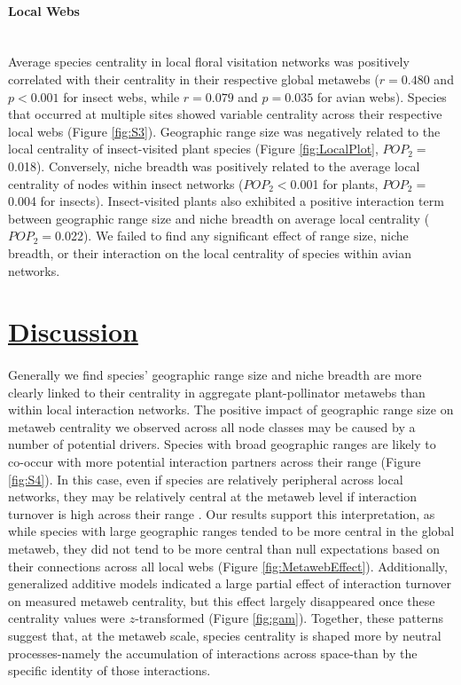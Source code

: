 \paragraph*{Local Webs}\mbox{}\\ 
Average species centrality in local floral visitation networks was positively correlated with their centrality in their respective global metawebs ($r=0.480$ and $p<0.001$ for insect webs, while $r=0.079$ and $p=0.035$ for avian webs). Species that occurred at multiple sites showed variable centrality across their respective local webs (Figure \ref{fig:S3}). Geographic range size was negatively related to the local centrality of insect-visited plant species (Figure \ref{fig:LocalPlot}, $POP_2=$0.018). Conversely, niche breadth was positively related to the average local centrality of nodes within insect networks ($POP_2<$0.001 for plants, $POP_2=$0.004 for insects). Insect-visited plants also exhibited a positive interaction term between geographic range size and niche breadth on average local centrality ($POP_2=$0.022). We failed to find any significant effect of range size, niche breadth, or their interaction on the local centrality of species within avian networks.






\section*{\textbf{\underline{Discussion}}}
\paragraph*{} Generally we find species' geographic range size and niche breadth are more clearly linked to their centrality in aggregate plant-pollinator metawebs than within local interaction networks. The positive impact of geographic range size on metaweb centrality we observed across all node classes may be caused by a number of potential drivers. Species with broad geographic ranges are likely to co-occur with more potential interaction partners across their range (Figure \ref{fig:S4}). In this case, even if species are relatively peripheral across local networks, they may be relatively central at the metaweb level if interaction turnover is high across their range \parencite{martins2025determinants}. Our results support this interpretation, as while species with large geographic ranges tended to be more central in the global metaweb, they did not tend to be more central than null expectations based on their connections across all local webs (Figure \ref{fig:MetawebEffect}). Additionally, generalized additive models indicated a large partial effect of interaction turnover on measured metaweb centrality, but this effect largely disappeared once these centrality values were $z$-transformed (Figure \ref{fig:gam}). Together, these patterns suggest that, at the metaweb scale, species centrality is shaped more by neutral processes-namely the accumulation of interactions across space-than by the specific identity of those interactions. 

